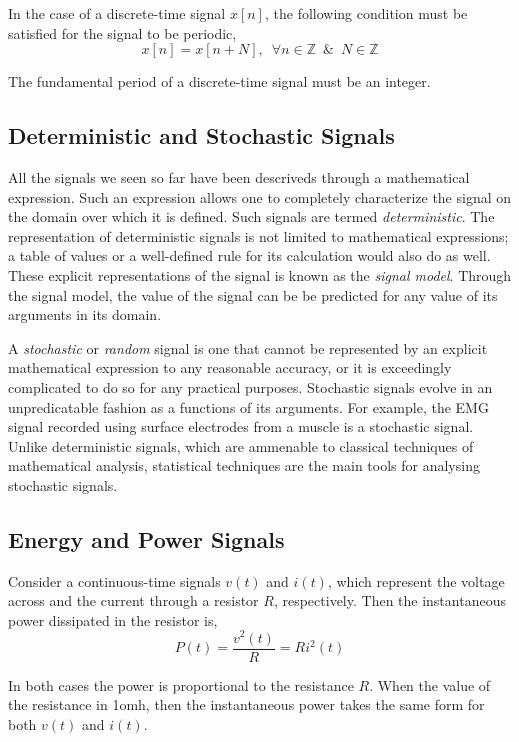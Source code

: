In the case of a discrete-time signal $x\left[n\right]$, the following condition must be satisfied for the signal to be periodic,
\[ x\left[n\right] = x\left[n + N\right], \,\,\, \forall n \in \mathbb{Z} \,\,\, \& \,\,\, N \in \mathbb{Z} \]

The fundamental period of a discrete-time signal must be an integer.

\subsection{Deterministic and Stochastic Signals}
All the signals we seen so far have been descriveds through a mathematical expression. Such an expression allows one to completely characterize the signal on the domain over which it is defined. Such signals are termed \textit{deterministic}. The representation of deterministic signals is not limited to mathematical expressions; a table of values or a well-defined rule for its calculation would also do as well. These explicit representations of the signal is known as the \textit{signal model}. Through the signal model, the value of the signal can be be predicted for any value of its arguments in its domain. 

A \textit{stochastic} or \textit{random} signal is one that cannot be represented by an explicit mathematical expression to any reasonable accuracy, or it is exceedingly complicated to do so for any practical purposes. Stochastic signals evolve in an unpredicatable fashion as a functions of its arguments. For example, the EMG signal recorded using surface electrodes from a muscle is a stochastic signal. Unlike deterministic signals, which are ammenable to classical techniques of mathematical analysis, statistical techniques are the main tools for analysing stochastic signals.

\subsection{Energy and Power Signals}
Consider a continuous-time signals $v\left(t\right)$ and $i\left(t\right)$, which represent the voltage across and the current through a resistor $R$, respectively. Then the instantaneous power dissipated in the resistor is,
\[ P\left(t\right) = \frac{v^{2}\left(t\right)}{R} = Ri^{2}\left(t\right) \]

In both cases the power is proportional to the resistance $R$. When the value of the resistance in 1omh, then the instantaneous power takes the same form for both $v\left(t\right)$ and $i\left(t\right)$.

